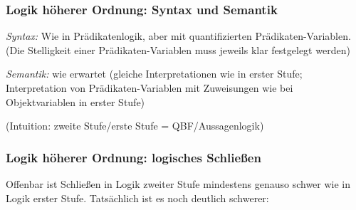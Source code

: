 \documentclass[aspectratio=1610,onlymath]{beamer}
\let\beameroriginaldoublebackslash\\
\let\\=\beameroriginaldoublebackslash
\begin{document}
\begin{frame}\frametitle{Logik höherer Ordnung: Syntax und Semantik}

\emph{Syntax:} Wie in Prädikatenlogik, aber mit quantifizierten Prädikaten-Variablen.\\
\textcolor{devilscss}{(Die Stelligkeit einer Prädikaten-Variablen muss jeweils klar festgelegt werden)}\medskip

\bigskip\pause

\emph{Semantik:} wie erwartet (gleiche Interpretationen wie in erster Stufe; Interpretation von Prädikaten-Variablen mit Zuweisungen wie bei Objektvariablen in erster Stufe)\medskip

\textcolor{devilscss}{(Intuition: zweite Stufe/erste Stufe = QBF/Aussagenlogik)}

\end{frame}

\begin{frame}\frametitle{Logik höherer Ordnung: logisches Schließen}

Offenbar ist Schließen in Logik zweiter Stufe mindestens genauso schwer wie in Logik erster Stufe. Tatsächlich ist es noch deutlich schwerer:\medskip


\end{frame}
\end{document}
